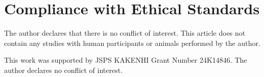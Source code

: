 \documentclass[smallextended,referee,envcountsect,]{svjour3}
\begin{document}
\section*{Compliance with Ethical Standards}
The author declares that there is no conflict of interest. This article does not contain any studies with human participants or animals performed by the author.

\begin{acknowledgements}
This work was supported by JSPS KAKENHI Grant Number 24K14846. The author declares no conflict of interest.
\end{acknowledgements}



\end{document}
